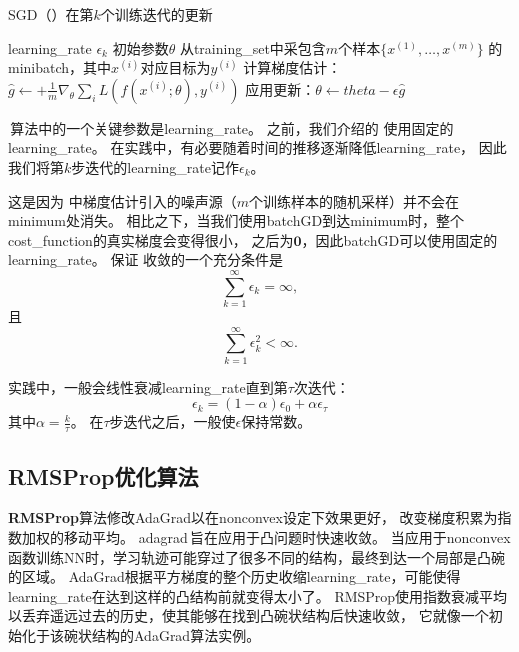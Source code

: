 \begin{algorithm}[ht]
	\caption{\gls{SGD}（）在第$k$个训练迭代的更新}
	\label{alg:sgd}
	\begin{algorithmic}
		\REQUIRE \gls{learning_rate} $\epsilon_k$
		\REQUIRE 初始参数$\theta$
		\STATE 从\gls{training_set}中采包含$m$个样本$\{ x^{(1)},\dots, x^{(m)}\}$ 的\gls{minibatch}，其中$x^{(i)}$对应目标为$y^{(i)}$
		\STATE 计算梯度估计： $\hat{g} \leftarrow + 
		\frac{1}{m} \nabla_{\theta} \sum_i L(f(x^{(i)};\theta),y^{(i)})$
		\STATE 应用更新：$\theta \leftarrow theta - \epsilon \hat{g}$
		\ENDWHILE
	\end{algorithmic}
\end{algorithm}

\,算法中的一个关键参数是\gls{learning_rate}。
之前，我们介绍的\,\,使用固定的\gls{learning_rate}。
在实践中，有必要随着时间的推移逐渐降低\gls{learning_rate}，
因此我们将第$k$步迭代的\gls{learning_rate}记作$\epsilon_k$。

这是因为\,\,中梯度估计引入的噪声源（$m$个训练样本的随机采样）并不会在\gls{minimum}处消失。
相比之下，当我们使用\gls{batch}\gls{GD}到达\gls{minimum}时，整个\gls{cost_function}的真实梯度会变得很小，
之后为$\mathbf{0}$，因此\gls{batch}\gls{GD}可以使用固定的\gls{learning_rate}。
保证\,\,收敛的一个充分条件是
\begin{equation}
\label{eq:8.12}
\sum_{k=1}^\infty \epsilon_k = \infty,
\end{equation}
且
\begin{equation}
\label{eq:8.13}
\sum_{k=1}^\infty \epsilon_k^2 < \infty.
\end{equation}

实践中，一般会线性衰减\gls{learning_rate}直到第$\tau$次迭代：
\begin{equation}
\label{eq:8.14}
\epsilon_k = (1-\alpha) \epsilon_0 + \alpha \epsilon_\tau
\end{equation}
其中$\alpha = \frac{k}{\tau}$。
在$\tau$步迭代之后，一般使$\epsilon$保持常数。

\subsection{RMSProp优化算法}
\label{sec:rmsprop}
\textbf{RMSProp}算法\citep{Hinton-ipam2012}修改AdaGrad以在\gls{nonconvex}设定下效果更好，
改变梯度积累为指数加权的移动平均。
\gls{adagrad}\,旨在应用于凸问题时快速收敛。
当应用于\gls{nonconvex}函数训练\gls{NN}时，学习轨迹可能穿过了很多不同的结构，最终到达一个局部是凸碗的区域。
AdaGrad根据平方梯度的整个历史收缩\gls{learning_rate}，可能使得\gls{learning_rate}在达到这样的凸结构前就变得太小了。
RMSProp使用指数衰减平均以丢弃遥远过去的历史，使其能够在找到凸碗状结构后快速收敛，
它就像一个初始化于该碗状结构的AdaGrad算法实例。

